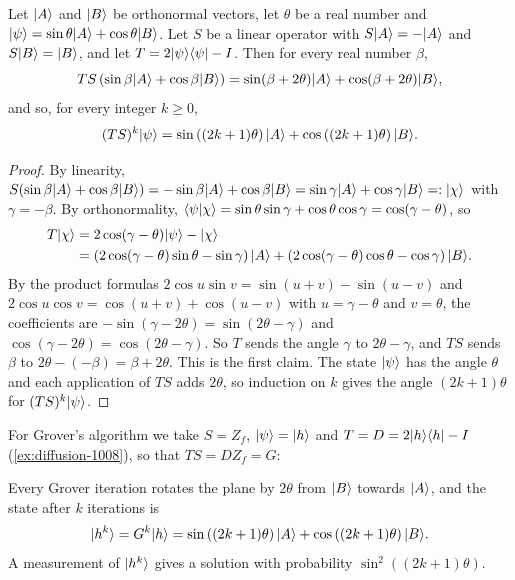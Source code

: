 \begin{claim}\label{lem:tworef-1008}
    Let $\lvert A \rangle$ and $\lvert B \rangle$ be orthonormal vectors, let $\theta$ be a real number and
    $\lvert \psi \rangle = \sin\theta \lvert A \rangle + \cos\theta \lvert B \rangle$. Let $S$ be a linear operator with
    $S\lvert A \rangle = -\lvert A \rangle$ and $S\lvert B \rangle = \lvert B \rangle$, and let $T = 2\lvert \psi \rangle\langle \psi \rvert - I$. Then for
    every real number $\beta$,
    \[T S \left(\sin\beta \lvert A \rangle + \cos\beta \lvert B \rangle\right)
        = \sin(\beta + 2\theta) \lvert A \rangle + \cos(\beta + 2\theta) \lvert B \rangle,\]
    and so, for every integer $k \geq 0$,
    \[(TS)^k \lvert \psi \rangle = \sin\left((2k+1)\theta\right) \lvert A \rangle + \cos\left((2k+1)\theta\right) \lvert B \rangle.\]
\end{claim}

\begin{proof}
    By linearity, $S(\sin\beta \lvert A \rangle + \cos\beta \lvert B \rangle) = -\sin\beta \lvert A \rangle + \cos\beta \lvert B \rangle
        = \sin\gamma \lvert A \rangle + \cos\gamma \lvert B \rangle =: \lvert \chi \rangle$ with $\gamma = -\beta$. By orthonormality,
    $\langle \psi \vert \chi \rangle = \sin\theta\sin\gamma + \cos\theta\cos\gamma = \cos(\gamma - \theta)$, so
    \begin{align*}
        T\lvert \chi \rangle & = 2\cos(\gamma - \theta)\lvert \psi \rangle - \lvert \chi \rangle                                     \\
                    & = \left(2\cos(\gamma - \theta)\sin\theta - \sin\gamma\right)\lvert A \rangle
        + \left(2\cos(\gamma - \theta)\cos\theta - \cos\gamma\right)\lvert B \rangle.
    \end{align*}
    By the product formulas $2\cos u \sin v = \sin(u + v) - \sin(u - v)$ and
    $2\cos u \cos v = \cos(u + v) + \cos(u - v)$ with $u = \gamma - \theta$ and $v = \theta$, the
    coefficients are $-\sin(\gamma - 2\theta) = \sin(2\theta - \gamma)$ and
    $\cos(\gamma - 2\theta) = \cos(2\theta - \gamma)$. So $T$ sends the angle $\gamma$ to
    $2\theta - \gamma$, and $TS$ sends $\beta$ to $2\theta - (-\beta) = \beta + 2\theta$. This is the
    first claim. The state $\lvert \psi \rangle$ has the angle $\theta$ and each application of $TS$ adds
    $2\theta$, so induction on $k$ gives the angle $(2k+1)\theta$ for $(TS)^k\lvert \psi \rangle$.
\end{proof}

For Grover's algorithm we take $S = Z_f$, $\lvert \psi \rangle = \lvert h \rangle$ and $T = D = 2\lvert h \rangle\langle h \rvert - I$
(\cref{ex:diffusion-1008}), so that $TS = D Z_f = G$:

\begin{corollary}\label{cor:hk-1008}
    Every Grover iteration rotates the plane by $2\theta$ from $\lvert B \rangle$ towards $\lvert A \rangle$, and the
    state after $k$ iterations is
    \[\lvert h^k \rangle = G^k\lvert h \rangle = \sin\left((2k+1)\theta\right) \lvert A \rangle + \cos\left((2k+1)\theta\right) \lvert B \rangle.\]
    A measurement of $\lvert h^k \rangle$ gives a solution with probability $\sin^2\left((2k+1)\theta\right)$.
\end{corollary}

